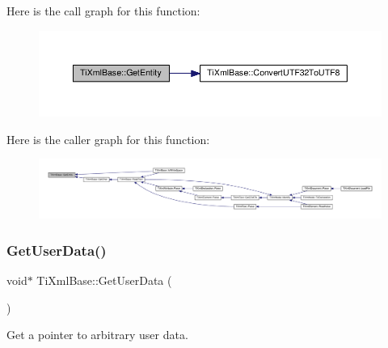 Here is the call graph for this function\+:
\nopagebreak
\begin{figure}[H]
\begin{center}
\leavevmode
\includegraphics[width=350pt]{class_ti_xml_base_ac5c08bf3deffcda0bf8ce2958372b584_cgraph}
\end{center}
\end{figure}
Here is the caller graph for this function\+:
\nopagebreak
\begin{figure}[H]
\begin{center}
\leavevmode
\includegraphics[width=350pt]{class_ti_xml_base_ac5c08bf3deffcda0bf8ce2958372b584_icgraph}
\end{center}
\end{figure}
\mbox{\label{class_ti_xml_base_a6559a530ca6763fc301a14d77ed28c17}} 
\subsubsection{\texorpdfstring{Get\+User\+Data()}{GetUserData()}\hspace{0.1cm}{\footnotesize\ttfamily [1/2]}}
{\footnotesize\ttfamily void$\ast$ Ti\+Xml\+Base\+::\+Get\+User\+Data (\begin{DoxyParamCaption}{ }\end{DoxyParamCaption})\hspace{0.3cm}{\ttfamily [inline]}}



Get a pointer to arbitrary user data. 

\mbox{\label{class_ti_xml_base_aaaaefcef8c0e6e32f8920f4982b2daf3}} 
